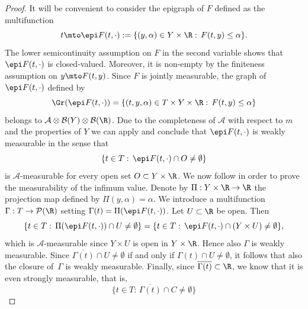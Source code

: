 \begin{proof}
It will be convenient to consider the epigraph of $F$ defined as the multifunction\vspace*{-3pt}
\begin{equation*}
t\mto \epi  F(t,\cdot):=\{(y,\alpha)\in Y\times\R:\,F(t,y)\leq\alpha\}.
\end{equation*}
The lower semicontinuity assumption on $F$ in the second variable shows that $\epi  F(t,\cdot)$ is closed-valued. Moreover, it is non-empty by the finiteness assumption on $y\mto F(t,y)$. Since $F$ is jointly measurable, the graph of $\epi F(t,\cdot)$ defined by\vspace*{-3pt}
\begin{equation*}
\Gr (\epi F(t,\cdot))=\{(t,y,\alpha)\in T\times Y\times\R:\,F(t,y)\leq\alpha\}
\end{equation*}
belongs to $\mathcal{A}\otimes\mathcal{B}(Y)\otimes\mathcal{B}(\R)$. Due to the completeness of $\mathcal{A}$ with respect to $m$ and the properties of $Y$ we can apply \cite[Rem.\,6.11]{FoLe} and conclude that $\epi F(t,\cdot)$ is weakly measurable in the sense that\vspace*{-3pt}
\begin{equation*}
\{t\in T:\,\epi F(t,\cdot)\cap O\neq\emptyset\}
\end{equation*}
is $\mathcal{A}$-measurable for every open set $O\subset Y\times \R$. We now follow \cite[Th.\,14.37]{RoWe98} in order to prove the measurability of the infimum value. Denote by $\Pi:Y\times\R\to\R$ the projection map defined by $\Pi(y,\alpha)=\alpha$. We introduce a multifunction $\Gamma:T\to \mathcal{P}(\R)$ setting $\Gamma(t)=\Pi (\epi F(t,\cdot))$. Let $U\subset\R$ be open. Then\vspace*{-3pt}
\begin{equation*}
\{t\in T:\,\Pi(\epi F(t,\cdot))\cap U\neq\emptyset\}=\{t\in T:\,\epi F(t,\cdot)\cap (Y\times U)\neq\emptyset\},
\end{equation*}
which is $\mathcal{A}$-measurable since $Y\times U$ is open in $Y\times\R$. Hence also $\Gamma$ is weakly measurable. Since $\overline{\Gamma(t)}\cap U\neq\emptyset$ if and only if $\Gamma(t)\cap U\neq\emptyset$, it follows that also the closure of~$\Gamma$ is weakly measurable. Finally, since $\overline{\Gamma(t)}\subset\R$, we know that it is even strongly measurable, that is,\vspace*{-3pt}
\begin{equation*}
\{t\in T:\,\overline{\Gamma(t)}\cap C\neq\emptyset\}
\end{equation*}

\end{proof}
